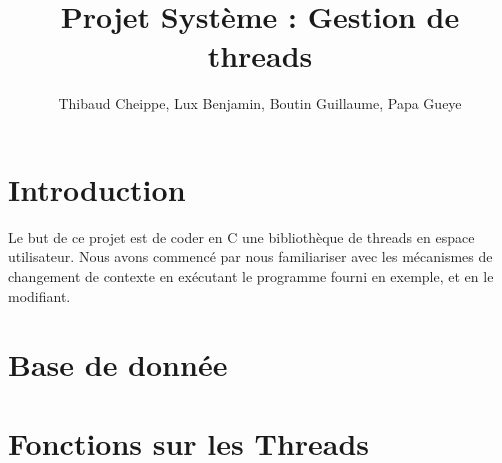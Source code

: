 \documentclass[a4paper,11pt]{report}
\title{Projet Système : Gestion de threads}
\author{Thibaud Cheippe, Lux Benjamin, Boutin Guillaume, Papa Gueye}
\begin{document}
\maketitle



\chapter*{Introduction}

Le but de ce projet est de coder en C une bibliothèque de threads en espace utilisateur. Nous avons commencé par nous familiariser avec les mécanismes de changement de contexte en exécutant le programme fourni en exemple, et en le modifiant. 

\chapter{Base de donnée} 


\chapter{Fonctions sur les Threads}

\end{document}
